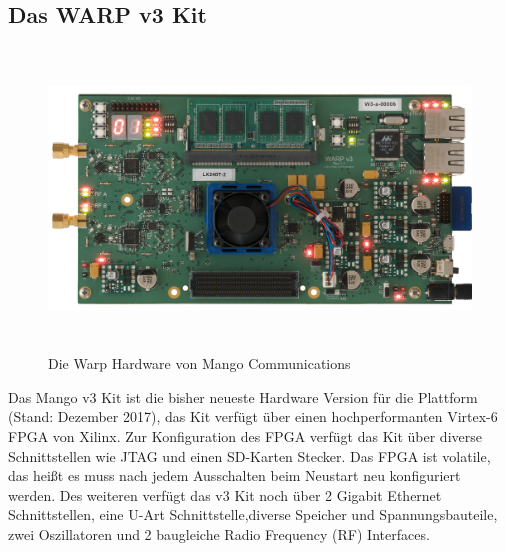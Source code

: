 \documentclass[letterpaper,11pt]{article}
\begin{document}
\begin{onehalfspace}
\subsection{Das WARP v3 Kit}
\begin{figure}[H]
\begin{center}
\includegraphics[width = 16cm,height=8cm]{w3_kit_med.jpg}
\caption{Die Warp Hardware von Mango Communications \cite{[2]}}
\label{fig11}
\end{center}
\end{figure}
\noindent Das Mango v3 Kit ist die bisher neueste Hardware Version für die Plattform (Stand: Dezember 2017), das Kit verfügt über einen hochperformanten Virtex-6 FPGA von Xilinx. Zur Konfiguration des FPGA verfügt das Kit über diverse Schnittstellen wie JTAG und einen SD-Karten Stecker. Das FPGA ist volatile, das heißt es muss nach jedem Ausschalten beim Neustart neu konfiguriert werden. Des weiteren verfügt das v3 Kit noch über 2 Gigabit Ethernet Schnittstellen, eine U-Art Schnittstelle,diverse Speicher und Spannungsbauteile, zwei Oszillatoren und 2 baugleiche Radio Frequency (RF) Interfaces. 

\end{onehalfspace}
\end{document}
